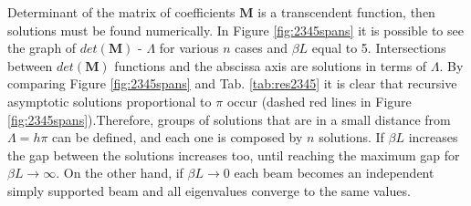 \documentclass{article}
\begin{document}
{\noindent Determinant of the matrix of coefficients $\textbf{M}$ is a transcendent function, then solutions must be found numerically.\newline
In Figure \ref{fig:2345spans} it is possible to see the graph of $det(\textbf{M})$ - $\Lambda$ for various $n$ cases and $\beta L$ equal to 5. Intersections between $det(\textbf{M})$ functions and the abscissa axis are solutions in terms of $\Lambda$. By comparing Figure \ref{fig:2345spans} and Tab. \ref{tab:res2345} it is clear that recursive asymptotic solutions proportional to $\pi$ occur (dashed red lines in Figure \ref{fig:2345spans}).Therefore, groups of solutions that are in a small distance from $\Lambda = h \pi$  can be defined, and each one is composed by $n$ solutions. If $\beta L$ increases the gap between the solutions increases too, until reaching the maximum gap for $\beta L\xrightarrow{}\infty$. On the other hand, if $\beta L\xrightarrow{}0$ each beam becomes an independent simply supported beam and all eigenvalues converge to the same values.

}
\end{document}

